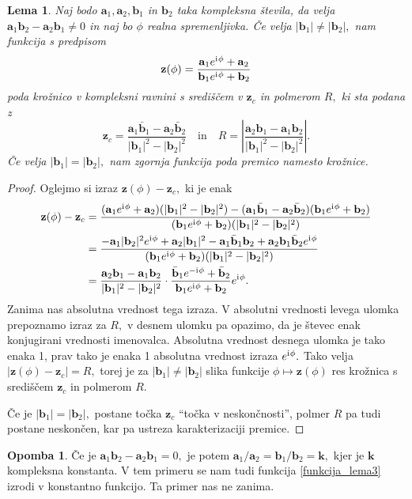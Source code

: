 \documentclass[12pt,a4paper,twoside]{article}
\newcommand{\iu}{\mathrm{i}\mkern1mu} %
\theoremstyle{definition} %
\newtheorem{opomba}[definicija]{Opomba}
\theoremstyle{plain} %
\newtheorem{lema}[definicija]{Lema}
\theoremstyle{primerstyle}
\numberwithin{equation}{section}  %
\newcommand{\aV}{\mathbf{a}}
\newcommand{\bV}{\mathbf{b}}
\newcommand{\kV}{\mathbf{k}}
\newcommand{\zV}{\mathbf{z}}
\begin{document}
\begin{lema}
	\label{lema_3}
	Naj bodo $\aV_1,\aV_2,\bV_1$ in $\bV_2$ taka kompleksna števila, da velja $\aV_1\bV_2-\aV_2\bV_1\neq 0$ in naj bo $\phi$ realna spremenljivka. Če velja $|\bV_1|\neq|\bV_2|,$ nam funkcija s predpisom
	\begin{equation}
		\label{funkcija_lema3}
		\zV(\phi)=\frac{\aV_1e^{\iu\phi}+\aV_2}{\bV_1e^{\iu\phi}+\bV_2}
	\end{equation}
	poda krožnico v kompleksni ravnini s središčem v $\zV_c$ in polmerom $R,$ ki sta podana z
	\begin{equation}
		\zV_c=\frac{\aV_1\bar{\bV}_1-\aV_2\bar{\bV}_2}{|\bV_1|^2-|\bV_2|^2}\quad\text{in}\quad R=\left|\frac{\aV_2\bV_1-\aV_1\bV_2}{|\bV_1|^2-|\bV_2|^2}\right|\!.
	\end{equation}
	Če velja $|\bV_1|=|\bV_2|,$ nam zgornja funkcija poda premico namesto krožnice.
\end{lema}
\begin{proof}
	Oglejmo si izraz $\zV(\phi)-\zV_c,$ ki je enak
	\begin{align*}
		\zV(\phi)-\zV_c&=\frac{(\aV_1e^{\iu\phi}+\aV_2)(|\bV_1|^2-|\bV_2|^2)-(\aV_1\bar{\bV}_1-\aV_2\bar{\bV}_2)(\bV_1e^{\iu\phi}+\bV_2)}{(\bV_1e^{\iu\phi}+\bV_2)(|\bV_1|^2-|\bV_2|^2)}\\
		&=\frac{-\aV_1|\bV_2|^2e^{\iu\phi}+\aV_2|\bV_1|^2-\aV_1\bar{\bV}_1\bV_2+\aV_2\bV_1\bar{\bV}_2e^{\iu\phi}}{(\bV_1e^{\iu\phi}+\bV_2)(|\bV_1|^2-|\bV_2|^2)}\\
		&=\frac{\aV_2\bV_1-\aV_1\bV_2}{|\bV_1|^2-|\bV_2|^2}\cdot\frac{\bar{\bV}_1e^{-\iu\phi}+\bar{\bV}_2}{\bV_1e^{\iu\phi}+\bV_2}e^{\iu\phi}.
	\end{align*}
	Zanima nas absolutna vrednost tega izraza. V absolutni vrednosti levega ulomka prepoznamo izraz za $R,$ v desnem ulomku pa opazimo, da je števec enak konjugirani vrednosti imenovalca. Absolutna vrednost desnega ulomka je tako enaka 1, prav tako je enaka 1 absolutna vrednost izraza $e^{\iu\phi}.$ Tako velja $|\zV(\phi)-\zV_c|=R,$ torej je za $|\bV_1|\neq|\bV_2|$ slika funkcije $\phi\mapsto\zV(\phi)$ res krožnica s središčem $\zV_c$ in polmerom $R.$
	
	Če je $|\bV_1|=|\bV_2|,$ postane točka $\zV_c$ ``točka v neskončnosti'', polmer $R$ pa tudi postane neskončen, kar pa ustreza karakterizaciji premice.
\end{proof}

\begin{opomba}
	Če je $\aV_1\bV_2-\aV_2\bV_1=0,$ je potem $\aV_1/\aV_2=\bV_1/\bV_2=\kV,$ kjer je $\kV$ kompleksna konstanta. V tem primeru se nam tudi funkcija \eqref{funkcija_lema3} izrodi v konstantno funkcijo. Ta primer nas ne zanima.
\end{opomba}
\end{document}
